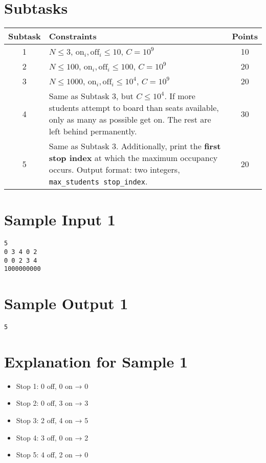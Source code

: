 \documentclass[12pt,a4paper]{article}
\begin{document}
\section*{Subtasks}
\begin{center}
\begin{tabularx}{\textwidth}{|c|X|c|}
\hline
\textbf{Subtask} & \textbf{Constraints} & \textbf{Points} \\
\hline
1 & $N \leq 3$, $\text{on}_i, \text{off}_i \leq 10$, $C = 10^9$ & 10 \\
\hline
2 & $N \leq 100$, $\text{on}_i, \text{off}_i \leq 100$, $C = 10^9$ & 20 \\
\hline
3 & $N \leq 1000$, $\text{on}_i, \text{off}_i \leq 10^4$, $C = 10^9$ & 20 \\
\hline
4 & Same as Subtask 3, but $C \leq 10^4$. If more students attempt to board than seats available, only as many as possible get on. The rest are left behind permanently. & 30 \\
\hline
5 & Same as Subtask 3. Additionally, print the \textbf{first stop index} at which the maximum occupancy occurs. Output format: two integers, \texttt{max\_students stop\_index}. & 20 \\
\hline
\end{tabularx}
\end{center}

\section*{Sample Input 1}
\begin{verbatim}
5
0 3 4 0 2
0 0 2 3 4
1000000000
\end{verbatim}

\section*{Sample Output 1}
\begin{verbatim}
5
\end{verbatim}

\section*{Explanation for Sample 1}
\begin{itemize}
  \item Stop 1: 0 off, 0 on → 0  
  \item Stop 2: 0 off, 3 on → 3  
  \item Stop 3: 2 off, 4 on → 5  
  \item Stop 4: 3 off, 0 on → 2  
  \item Stop 5: 4 off, 2 on → 0  
\end{itemize}
\end{document}
